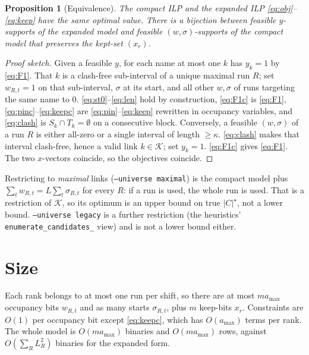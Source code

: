 \documentclass[11pt,a4paper]{article}
\theoremstyle{definition}
\theoremstyle{plain}
\newtheorem{proposition}{Proposition}
\theoremstyle{remark}
\newcommand{\Links}{\mathcal{K}}
\begin{document}
\begin{proposition}[Equivalence]
\label{prop:equiv}
The compact ILP and the expanded ILP \eqref{eq:obj}--\eqref{eq:keep}
have the same optimal value. There is a bijection between feasible
$y$-supports of the expanded model and feasible $(w,\sigma)$-supports of
the compact model that preserves the kept-set $(x_r)$.
\end{proposition}

\begin{proof}[Proof sketch]
Given a feasible $y$, for each name at most one $k$ has $y_k=1$
by \eqref{eq:F1}. That $k$ is a clash-free sub-interval of a unique
maximal run $R$; set $w_{R,t}=1$ on that sub-interval, $\sigma$ at its
start, and all other $w,\sigma$ of runs targeting the same name to $0$.
\eqref{eq:st0}--\eqref{eq:len} hold by construction,
\eqref{eq:F1c} is \eqref{eq:F1}, \eqref{eq:pinc}--\eqref{eq:keepc} are
\eqref{eq:pin}--\eqref{eq:keep} rewritten in occupancy variables, and
\eqref{eq:clash} is $S_k \cap T_k = \emptyset$ on a consecutive block.
Conversely, a feasible $(w,\sigma)$ of a run $R$ is either all-zero or a
single interval of length $\ge \kappa$. \eqref{eq:clash} makes that
interval clash-free, hence a valid link $k \in \Links$; set $y_k=1$.
\eqref{eq:F1c} gives \eqref{eq:F1}. The two $x$-vectors coincide, so the
objectives coincide.
\end{proof}

Restricting to \emph{maximal} links
(\texttt{--universe maximal}) is the compact model plus
$\sum_t w_{R,t} = L \sum_t \sigma_{R,t}$ for every $R$: if a run is used,
the whole run is used. That is a restriction of $\Links$, so its optimum
is an upper bound on true $|C|^\star$, not a lower bound.
\texttt{--universe legacy} is a further restriction (the heuristics'
\texttt{enumerate\_candidates\_} view) and is not a lower bound either.

\section{Size}
\label{sec:size}

Each rank belongs to at most one run per shift, so there are at most
$m a_{\max}$ occupancy bits $w_{R,t}$ and as many starts $\sigma_{R,t}$,
plus $m$ keep-bits $x_r$. Constraints are $O(1)$ per occupancy bit
except \eqref{eq:keepc}, which has $O(a_{\max})$ terms per rank. The
whole model is $O(m a_{\max})$ binaries and $O(m a_{\max})$ rows,
against $O(\sum_R L_R^2)$ binaries for the expanded form.
\end{document}
